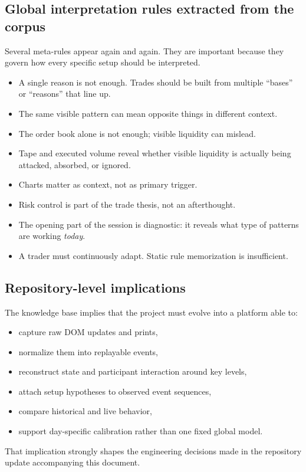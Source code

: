 \subsection{Global interpretation rules extracted from the corpus}

Several meta-rules appear again and again. They are important because they govern how every specific setup should be interpreted.

\begin{itemize}
\item A single reason is not enough. Trades should be built from multiple ``bases'' or ``reasons'' that line up.
\item The same visible pattern can mean opposite things in different context.
\item The order book alone is not enough; visible liquidity can mislead.
\item Tape and executed volume reveal whether visible liquidity is actually being attacked, absorbed, or ignored.
\item Charts matter as context, not as primary trigger.
\item Risk control is part of the trade thesis, not an afterthought.
\item The opening part of the session is diagnostic: it reveals what type of patterns are working \emph{today}.
\item A trader must continuously adapt. Static rule memorization is insufficient.
\end{itemize}

\subsection{Repository-level implications}

The knowledge base implies that the project must evolve into a platform able to:

\begin{itemize}
\item capture raw DOM updates and prints,
\item normalize them into replayable events,
\item reconstruct state and participant interaction around key levels,
\item attach setup hypotheses to observed event sequences,
\item compare historical and live behavior,
\item support day-specific calibration rather than one fixed global model.
\end{itemize}

That implication strongly shapes the engineering decisions made in the repository update accompanying this document.

